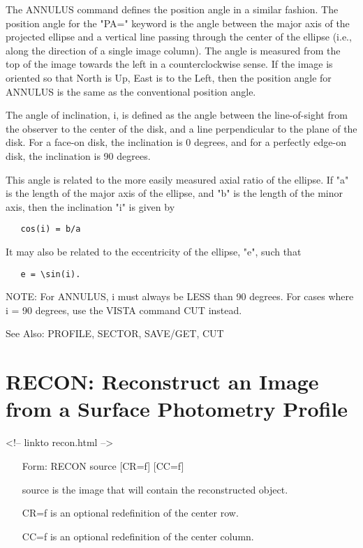 The ANNULUS command defines the position angle in a similar fashion.  The
position angle for the "PA=" keyword is the angle between the major axis of
the projected ellipse and a vertical line passing through the center of the
ellipse (i.e., along the direction of a single image column).  The angle is
measured from the top of the image towards the left in a counterclockwise
sense.  If the image is oriented so that North is Up, East is to the Left,
then the position angle for ANNULUS is the same as the conventional
position angle.

The angle of inclination, i, is defined as the angle between the
line-of-sight from the observer to the center of the disk, and a line
perpendicular to the plane of the disk.  For a face-on disk, the
inclination is 0 degrees, and for a perfectly edge-on disk, the inclination
is 90 degrees.

This angle is related to the more easily measured axial ratio of the
ellipse.  If "a" is the length of the major axis of the ellipse, and "b" is
the length of the minor axis, then the inclination "i" is given by
\begin{verbatim}
   cos(i) = b/a
\end{verbatim}
It may also be related to the eccentricity of the ellipse, "e", such that
\begin{verbatim}
   e = \sin(i).
\end{verbatim}
NOTE: For ANNULUS, i must always be LESS than 90 degrees.  For cases where
i = 90 degrees, use the VISTA command CUT instead.

See Also: PROFILE, SECTOR, SAVE/GET, CUT


\section{RECON: Reconstruct an Image from a Surface Photometry Profile}
\begin{rawhtml}
<!-- linkto recon.html -->
\end{rawhtml}
\begin{itemize}
  \item[Form: RECON source {[CR=f]} {[CC=f]}\hfill]{}
  \item[source]{is the image that will contain the reconstructed object.}
  \item[CR=f]{is an optional redefinition of the center row.}
  \item[CC=f]{is an optional redefinition of the center column.}
\end{itemize}

